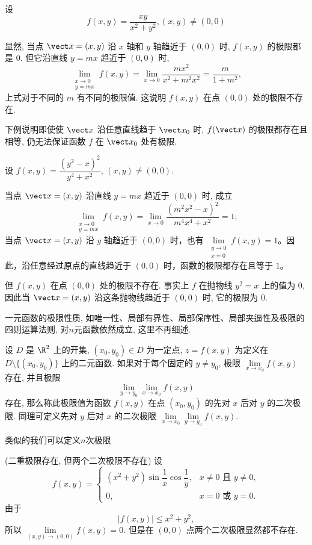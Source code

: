 \begin{example}
	设 $$f(x, y) = \dfrac{xy}{x^2 + y^2}, (x, y) \neq (0, 0)$$

	显然, 当点 $\vect x = (x, y)$ 沿 $x$ 轴和 $y$ 轴趋近于 $(0, 0)$ 时, $f(x, y)$ 的极限都是 $0$. 但它沿直线 $y = mx$ 趋近于 $(0, 0)$ 时,
	\[
	\lim_{\substack{x \to 0\\y = mx}} f(x, y) = \lim_{x \to 0} \frac{m x^2}{x^2 + m^2 x^2} = \frac{m}{1 + m^2},
	\]
	上式对于不同的 $m$ 有不同的极限值. 这说明 $f(x, y)$ 在点 $(0, 0)$ 处的极限不存在.
\end{example}

下例说明即使使 $\vect x$ 沿任意直线趋于 $\vect x_0$ 时, $f(\vect x)$ 的极限都存在且相等, 仍无法保证函数 $f$ 在 $\vect x_0$ 处有极限.

\begin{example}
	设 $f(x, y) = \dfrac{(y^2 - x)^2}{y^4 + x^2}$, $(x, y) \neq (0, 0)$.

	当点 $\vect x = (x, y)$ 沿直线 $y = mx$ 趋近于 $(0, 0)$ 时, 成立
	\[
	\lim_{\substack{x \to 0\\y = mx}} f(x, y) = \lim_{x \to 0} \frac{(m^2 x^2 - x)^2}{m^4 x^4 + x^2} = 1;
	\]
当点 $\vect x=(x,y)$ 沿 $y$ 轴趋近于 $(0,0)$ 时，也有 $\lim\limits_{\substack{y\to0\\x=0}}f(x,y)=1$。因此，沿任意经过原点的直线趋近于 $(0,0)$ 时，函数的极限都存在且等于 $1$。

	但 $f(x, y)$ 在点 $(0, 0)$ 处的极限不存在. 事实上 $f$ 在抛物线 $y^2 = x$ 上的值为 $0$, 因此当 $\vect x = (x, y)$ 沿这条抛物线趋近于 $(0, 0)$ 时, 它的极限为 $0$.
\end{example}

一元函数的极限性质, 如唯一性、局部有界性、局部保序性、局部夹逼性及极限的四则运算法则, 对$n $元函数依然成立, 这里不再细述. 

\begin{definition}
	设 $D$ 是 $\R^2$ 上的开集, $(x_0, y_0) \in D$ 为一定点, $z = f(x, y)$ 为定义在 $D \setminus \{ (x_0, y_0) \}$ 上的二元函数. 如果对于每个固定的 $y \neq y_0$, 极限 $\lim\limits_{x \to x_0} f(x, y)$ 存在, 并且极限
	\[
	\lim_{y \to y_0} \lim_{x \to x_0} f(x, y)
	\]
	存在, 那么称此极限值为函数 $f(x, y)$ 在点 $(x_0, y_0)$ 的先对 $x$ 后对 $y$ 的二次极限. 同理可定义先对 $y$ 后对 $x$ 的二次极限 $\lim\limits_{x \to x_0} \lim\limits_{y \to y_0} f(x, y)$.
\end{definition}
类似的我们可以定义$n$次极限

\begin{example}(二重极限存在, 但两个二次极限不存在)
	设
	\[
	f(x, y) = \begin{cases}
		(x^2 + y^2) \sin \dfrac{1}{x} \cos \dfrac{1}{y}, & x \neq 0 \text{ 且 } y \neq 0, \\
		0, & x = 0 \text{ 或 } y = 0.
	\end{cases}
	\]
	由于
	\[
	|f(x, y)| \le x^2 + y^2,
	\]
	所以 $\lim\limits_{(x, y) \to (0, 0)} f(x, y) = 0$. 但是在 $(0, 0)$ 点两个二次极限显然都不存在.
\end{example}

